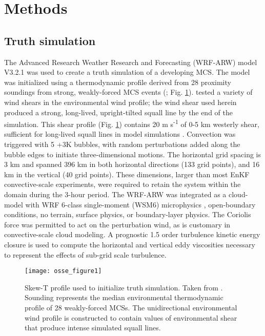 \section{Methods}
\subsection{Truth simulation}

The Advanced Research Weather Research and Forecasting (WRF-ARW) model \citep{skamarocketal08} V3.2.1 was used to create a truth simulation of a developing MCS. The model was initialized using a thermodynamic profile derived from 28 proximity soundings from strong, weakly-forced MCS events (\citealt{coniglioetal06}; Fig. \ref{osse_fig1}). \citet{coniglioetal06} tested a variety of wind shears in the environmental wind profile; the wind shear used herein produced a strong, long-lived, upright-tilted squall line by the end of the simulation. This shear profile (Fig. \ref{osse_fig1}) contains 20 m s\textsuperscript{-1} of 0-5 km westerly shear, sufficient for long-lived squall lines in model simulations \citep{weismanrotunno04}. Convection was triggered with 5 +3K bubbles, with random perturbations added along the bubble edges to initiate three-dimensional motions. The horizontal grid spacing is 3 km and spanned 396 km in both horizontal directions (133 grid points), and 16 km in the vertical (40 grid points). These dimensions, larger than most EnKF convective-scale experiments, were required to retain the system within the domain during the 3-hour period. The WRF-ARW was integrated as a cloud-model with WRF 6-class single-moment (WSM6) microphysics \citep{honglim06}, open-boundary conditions, no terrain, surface physics, or boundary-layer physics. The Coriolis force was permitted to act on the perturbation wind, as is customary in convective-scale cloud modeling. A prognostic 1.5 order turbulence kinetic energy closure is used to compute the horizontal and vertical eddy viscosities necessary to represent the effects of sub-grid scale turbulence.

\begin{figure}
\centering
\texttt{[image: osse\_figure1]}
\caption{Skew-T profile used to initialize truth simulation. Taken from \citet{coniglioetal06}. Sounding represents the median environmental thermodynamic profile of 28 weakly-forced MCSs. The unidirectional environmental wind profile is constructed to contain values of environmental shear that produce intense simulated squall lines.}
\label{osse_fig1}
\end{figure}

